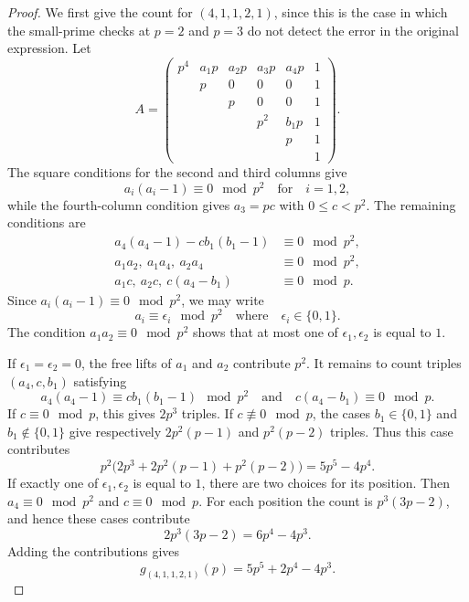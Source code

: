 \documentclass[a4paper]{amsart}
\numberwithin{equation}{section}
\theoremstyle{remark}
\begin{document}
\begin{proof}
We first give the count for $(4,1,1,2,1)$, since this is the case in which the small-prime checks at $p=2$ and $p=3$ do not detect the error in the original expression. Let
\[A=\begin{pmatrix}
p^4&a_1p&a_2p&a_3p&a_4p&1\\
&p&0&0&0&1\\
&&p&0&0&1\\
&&&p^2&b_1p&1\\
&&&&p&1\\
&&&&&1
\end{pmatrix}.\]
The square conditions for the second and third columns give
\[a_i(a_i-1)\equiv0\mod p^2\quad\text{for}\quad i=1,2,\]
while the fourth-column condition gives $a_3=pc$ with $0\leq c<p^2$. The remaining conditions are
\begin{align*}
a_4(a_4-1)-c b_1(b_1-1)&\equiv0\mod p^2,\\
a_1a_2,\ a_1a_4,\ a_2a_4&\equiv0\mod p^2,\\
a_1c,\ a_2c,\ c(a_4-b_1)&\equiv0\mod p.
\end{align*}
Since $a_i(a_i-1)\equiv0\mod p^2$, we may write
\[a_i\equiv\epsilon_i\mod p^2\quad\text{where}\quad \epsilon_i\in\{0,1\}.\]
The condition $a_1a_2\equiv0\mod p^2$ shows that at most one of $\epsilon_1,\epsilon_2$ is equal to $1$.

If $\epsilon_1=\epsilon_2=0$, the free lifts of $a_1$ and $a_2$ contribute $p^2$. It remains to count triples $(a_4,c,b_1)$ satisfying
\[a_4(a_4-1)\equiv c b_1(b_1-1)\mod p^2\quad\text{and}\quad c(a_4-b_1)\equiv0\mod p.\]
If $c\equiv0\mod p$, this gives $2p^3$ triples. If $c\not\equiv0\mod p$, the cases $b_1\in\{0,1\}$ and $b_1\notin\{0,1\}$ give respectively $2p^2(p-1)$ and $p^2(p-2)$ triples. Thus this case contributes
\[p^2\bigl(2p^3+2p^2(p-1)+p^2(p-2)\bigr)=5p^5-4p^4.\]
If exactly one of $\epsilon_1,\epsilon_2$ is equal to $1$, there are two choices for its position. Then $a_4\equiv0\mod p^2$ and $c\equiv0\mod p$. For each position the count is $p^3(3p-2)$, and hence these cases contribute
\[2p^3(3p-2)=6p^4-4p^3.\]
Adding the contributions gives
\[g_{(4,1,1,2,1)}(p)=5p^5+2p^4-4p^3.\]


\end{proof}
\end{document}

